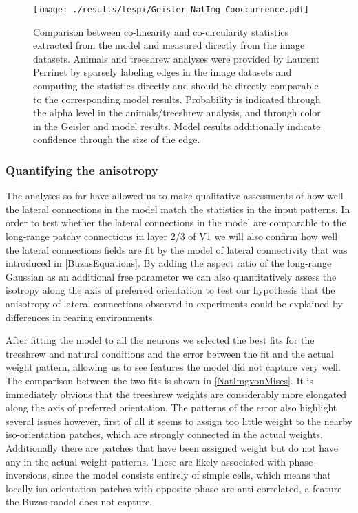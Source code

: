 \begin{figure}
	\centering
        \texttt{[image: ./results/lespi/Geisler\_NatImg\_Cooccurrence.pdf]}
	\caption{Comparison between co-linearity and co-circularity
      statistics extracted from the model and measured directly from
      the image datasets. Animals and treeshrew analyses were provided
      by Laurent Perrinet by sparsely labeling edges in the image
      datasets and computing the statistics directly and should be
      directly comparable to the corresponding model
      results. Probability is indicated through the alpha level in the
      animals/treeshrew analysis, and through color in the Geisler and
      model results. Model results additionally indicate confidence
      through the size of the edge. }
	\label{NatImgGeisler}
\end{figure}

\subsubsection{Quantifying the anisotropy}

The analyses so far have allowed us to make qualitative assessments of
how well the lateral connections in the model match the statistics in
the input patterns. In order to test whether the lateral connections
in the model are comparable to the long-range patchy connections in
layer 2/3 of V1 we will also confirm how well the lateral connections
fields are fit by the \cite{Buzas2006} model of lateral connectivity
that was introduced in \ref{BuzasEquations}. By adding the aspect
ratio of the long-range Gaussian as an additional free parameter we
can also quantitatively assess the isotropy along the axis of
preferred orientation to test our hypothesis that the anisotropy of
lateral connections observed in experiments \cite{Bosking1997} could
be explained by differences in rearing environments.

After fitting the model to all the neurons we selected the best fits
for the treeshrew and natural conditions and the error between the fit
and the actual weight pattern, allowing us to see features the model
did not capture very well. The comparison between the two fits is
shown in \ref{NatImgvonMises}. It is immediately obvious that the
treeshrew weights are considerably more elongated along the axis of
preferred orientation. The patterns of the error also highlight
several issues however, first of all it seems to assign too little
weight to the nearby iso-orientation patches, which are strongly
connected in the actual weights. Additionally there are patches that
have been assigned weight but do not have any in the actual weight
patterns. These are likely associated with phase-inversions, since the
model consists entirely of simple cells, which means that locally
iso-orientation patches with opposite phase are anti-correlated, a
feature the Buzas model does not capture.


